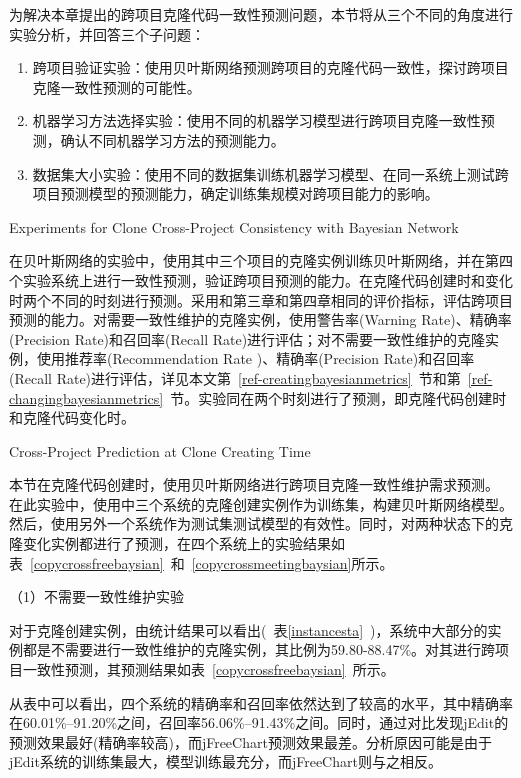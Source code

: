 为解决本章提出的跨项目克隆代码一致性预测问题，本节将从三个不同的角度进行实验分析，并回答三个子问题：
\begin{enumerate}
\item
跨项目验证实验：使用贝叶斯网络预测跨项目的克隆代码一致性，探讨跨项目克隆一致性预测的可能性。
\item
机器学习方法选择实验：使用不同的机器学习模型进行跨项目克隆一致性预测，确认不同机器学习方法的预测能力。
\item
数据集大小实验：使用不同的数据集训练机器学习模型、在同一系统上测试跨项目预测模型的预测能力，确定训练集规模对跨项目能力的影响。
\end{enumerate}

{Experiments for Clone Cross-Project Consistency with Bayesian Network}



在贝叶斯网络的实验中，使用其中三个项目的克隆实例训练贝叶斯网络，并在第四个实验系统上进行一致性预测，验证跨项目预测的能力。在克隆代码创建时和变化时两个不同的时刻进行预测。采用和第三章和第四章相同的评价指标，评估跨项目预测的能力。对需要一致性维护的克隆实例，使用警告率(Warning Rate)、精确率(Precision Rate)和召回率(Recall Rate)进行评估；对不需要一致性维护的克隆实例，使用推荐率(Recommendation Rate )、精确率(Precision Rate)和召回率(Recall Rate)进行评估，详见本文第~\ref{ref-creatingbayesianmetrics}~节和第~\ref{ref-changingbayesianmetrics}~节。实验同在两个时刻进行了预测，即克隆代码创建时和克隆代码变化时。

{Cross-Project Prediction at Clone Creating Time}

本节在克隆代码创建时，使用贝叶斯网络进行跨项目克隆一致性维护需求预测。
在此实验中，使用中三个系统的克隆创建实例作为训练集，构建贝叶斯网络模型。然后，使用另外一个系统作为测试集测试模型的有效性。同时，对两种状态下的克隆变化实例都进行了预测，在四个系统上的实验结果如表~\ref{copycrossfreebaysian}~和~\ref{copycrossmeetingbaysian}所示。

（1）不需要一致性维护实验

对于克隆创建实例，由统计结果可以看出(~表\ref{instancesta}~)，系统中大部分的实例都是不需要进行一致性维护的克隆实例，其比例为59.80-88.47\%。对其进行跨项目一致性预测，其预测结果如表~\ref{copycrossfreebaysian}~所示。

从表中可以看出，四个系统的精确率和召回率依然达到了较高的水平，其中精确率在60.01\%--91.20\%之间，召回率56.06\%--91.43\%之间。同时，通过对比发现jEdit的预测效果最好(精确率较高)，而jFreeChart预测效果最差。分析原因可能是由于jEdit系统的训练集最大，模型训练最充分，而jFreeChart则与之相反。

